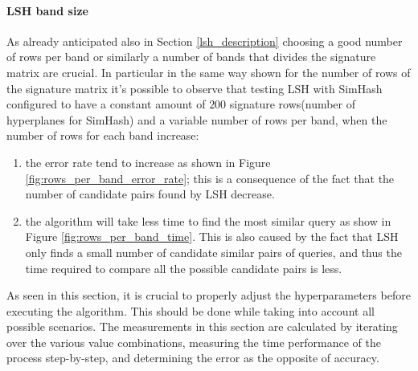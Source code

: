 


\paragraph{LSH band size} As already anticipated also in Section \ref{lsh_description} choosing a good number of rows per band or similarly a number of bands that divides the signature matrix are crucial. In particular in the same way shown for the number of rows of the signature matrix it's possible to observe that testing LSH with SimHash configured to have a constant amount of $200$ signature rows(number of hyperplanes for SimHash) and a variable number of rows per band, when the number of rows for each band increase:
\begin{enumerate}
    \item the error rate tend to increase as shown in Figure \ref{fig:rows_per_band_error_rate}; this is a consequence of the fact that the number of candidate pairs found by LSH decrease.
    \item the algorithm will take less time to find the most similar query as show in Figure \ref{fig:rows_per_band_time}. This is also caused by the fact that LSH only finds a small number of candidate similar pairs of queries, and thus the time required to compare all the possible candidate pairs is less.
\end{enumerate}





As seen in this section, it is crucial to properly adjust the hyperparameters before executing the algorithm. This should be done while taking into account all possible scenarios. The measurements in this section are calculated by iterating over the various value combinations, measuring the time performance of the process step-by-step, and determining the error as the opposite of accuracy. 

